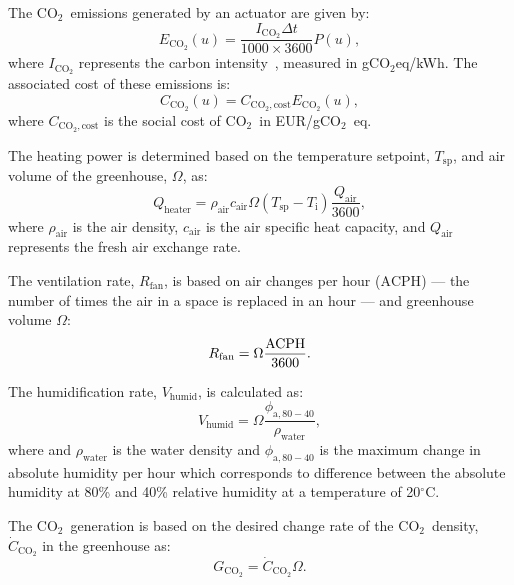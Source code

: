 \documentclass[conference]{IEEEtran}
\newcommand{\ui}[2]{#1_{\mathrm{#2}}}
\newcommand{\coo}{\ensuremath{\mathrm{CO_2}}}
\begin{document}
The \coo\ emissions generated by an actuator are given by:
\begin{equation}
    \ui{E}{\coo}(u) = \frac{\ui{I}{\coo}  \Delta t}{1000 \times 3600}  P(u),
\end{equation}
where \( \ui{I}{\coo} \) represents the carbon intensity~\cite{ElectricityMaps2022}, measured in g\coo{}eq/kWh. The associated cost of these emissions is:
\begin{equation}
    \ui{C}{\coo}(u) = \ui{C}{\coo,cost}  \ui{E}{\coo}(u),
\end{equation}
where \( \ui{C}{\coo,cost} \) is the social cost of \coo\ in EUR/g\coo\ eq.

The heating power is determined based on the temperature setpoint, \( \ui{T}{sp} \), and air volume of the greenhouse, \( \Omega \), as:
\begin{equation}
    \ui{Q}{heater} = \ui{\rho}{air}  \ui{c}{air}  \Omega  (\ui{T}{sp} - \ui{T}{i})  \frac{\ui{Q}{air}}{3600},
\end{equation}
where \( \ui{\rho}{air} \) is the air density, \( \ui{c}{air} \) is the air specific heat capacity, and \( \ui{Q}{air} \) represents the fresh air exchange rate.

The ventilation rate, \( \ui{R}{fan} \), is based on air changes per hour (\( \text{ACPH} \)) --- the number of times the air in a space is replaced in an hour --- and greenhouse volume \( \Omega \):
\begin{equation}
    \ui{R}{fan} = \Omega \frac{\text{\( \text{ACPH} \)}}{3600}.
\end{equation}

The humidification rate, \( \ui{V}{humid} \), is calculated as:
\begin{equation}
    \ui{V}{humid} = \Omega \frac{\ui{\phi}{a, 80 - 40}}{\ui{\rho}{water}},
\end{equation}
where and \( \ui{\rho}{water} \) is the water density and  \( \ui{\phi}{a, 80 - 40} \) is the maximum change in absolute humidity per hour which corresponds to difference between the absolute humidity at 80\% and 40\% relative humidity at a temperature of 20\( ^\circ \)C.

The \coo\ generation is based on the desired change rate of the \coo\ density, \( \ui{\dot{C}}{\coo} \) in the greenhouse as:
\begin{equation}
    G_{\coo} = \ui{\dot{C}}{\coo} \Omega.
\end{equation}
\end{document}
